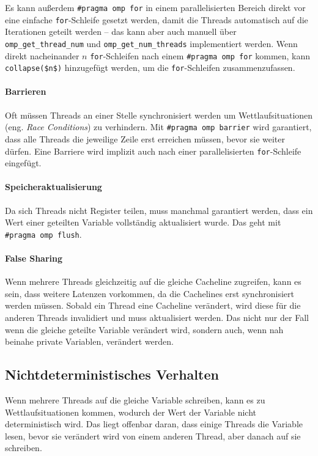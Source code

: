 Es kann außerdem \lstinline|#pragma omp for| in einem parallelisierten Bereich direkt vor eine einfache \lstinline|for|-Schleife gesetzt werden, damit die Threads automatisch auf die Iterationen geteilt werden -- das kann aber auch manuell über \lstinline|omp_get_thread_num| und \lstinline|omp_get_num_threads| implementiert werden.
Wenn direkt nacheinander \(n\) \lstinline|for|-Schleifen nach einem \lstinline|#pragma omp for| kommen, kann \lstinline|collapse($n$)| hinzugefügt werden, um die \lstinline|for|-Schleifen zusammenzufassen.

\paragraph{Barrieren}
Oft müssen Threads an einer Stelle synchronisiert werden um Wettlaufsituationen (eng. \emph{Race Conditions}) zu verhindern.
Mit \lstinline|#pragma omp barrier| wird garantiert, dass alle Threads die jeweilige Zeile erst erreichen müssen, bevor sie weiter dürfen.
Eine Barriere wird implizit auch nach einer parallelisierten \lstinline|for|-Schleife eingefügt.

\paragraph{Speicheraktualisierung}
Da sich Threads nicht Register teilen, muss manchmal garantiert werden, dass ein Wert einer geteilten Variable vollständig aktualisiert wurde.
Das geht mit \lstinline|#pragma omp flush|.

\paragraph{False Sharing}
Wenn mehrere Threads gleichzeitig auf die gleiche Cacheline zugreifen, kann es sein, dass weitere Latenzen vorkommen, da die Cachelines erst synchronisiert werden müssen.
Sobald ein Thread eine Cacheline verändert, wird diese für die anderen Threads invalidiert und muss aktualisiert werden.
Das nicht nur der Fall wenn die gleiche geteilte Variable verändert wird, sondern auch, wenn nah beinahe private Variablen, verändert werden.

\subsection{Nichtdeterministisches Verhalten}
Wenn mehrere Threads auf die gleiche Variable schreiben, kann es zu Wettlaufsituationen kommen, wodurch der Wert der Variable nicht deterministisch wird.
Das liegt offenbar daran, dass einige Threads die Variable lesen, bevor sie verändert wird von einem anderen Thread, aber danach auf sie schreiben.

